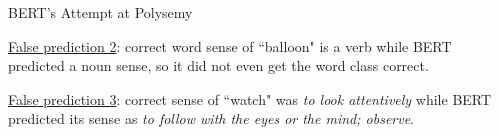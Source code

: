 \begin{frame}{BERT's Attempt at Polysemy}
\begin{itemizeSpaced}{15pt}
\begin{itemizeSpaced}{7pt}
            \item \underline{False prediction 2}: correct word sense of ``balloon" is a verb while BERT predicted a noun sense, so it did not even get the word class correct.
            
            \item \underline{False prediction 3}: correct sense of ``watch" was \emph{to look attentively} while BERT predicted its sense as \emph{to follow with the eyes or the mind; observe}. 
        \end{itemizeSpaced}
        
    \end{itemizeSpaced}
    
\end{frame}